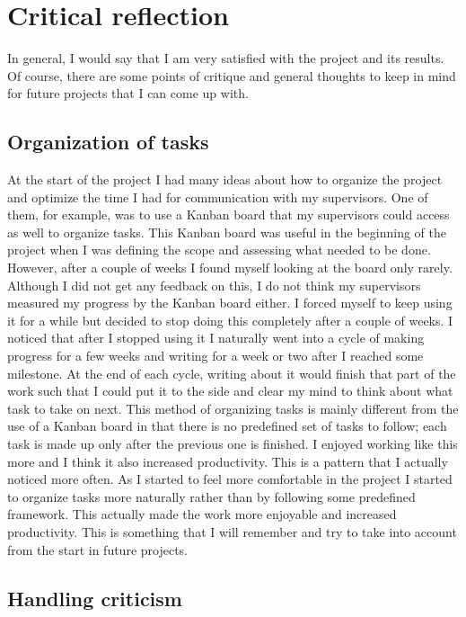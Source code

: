 \documentclass[]{article}
\begin{document}
\section{Critical reflection}

In general, I would say that I am very satisfied with the project and its results. Of course, there are some points of critique and general thoughts to keep in mind for future projects that I can come up with.

\subsection{Organization of tasks}

At the start of the project I had many ideas about how to organize the project and optimize the time I had for communication with my supervisors. One of them, for example, was to use a Kanban board that my supervisors could access as well to organize tasks. This Kanban board was useful in the beginning of the project when I was defining the scope and assessing what needed to be done. However, after a couple of weeks I found myself looking at the board only rarely. Although I did not get any feedback on this, I do not think my supervisors measured my progress by the Kanban board either. I forced myself to keep using it for a while but decided to stop doing this completely after a couple of weeks. I noticed that after I stopped using it I naturally went into a cycle of making progress for a few weeks and writing for a week or two after I reached some milestone. At the end of each cycle, writing about it would finish that part of the work such that I could put it to the side and clear my mind to think about what task to take on next. This method of organizing tasks is mainly different from the use of a Kanban board in that there is no predefined set of tasks to follow; each task is made up only after the previous one is finished. I enjoyed working like this more and I think it also increased productivity. This is a pattern that I actually noticed more often. As I started to feel more comfortable in the project I started to organize tasks more naturally rather than by following some predefined framework. This actually made the work more enjoyable and increased productivity. This is something that I will remember and try to take into account from the start in future projects.

\subsection{Handling criticism}
\end{document}
